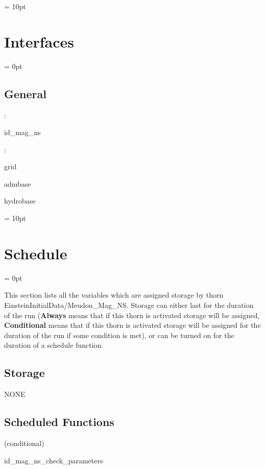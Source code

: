 \vspace{0.5cm}\parskip = 10pt 

\section{Interfaces} 


\parskip = 0pt

\vspace{3mm} \subsection*{General}

: 

id\_mag\_ns
\vspace{2mm}

: 

grid

admbase

hydrobase
\vspace{2mm}

\vspace{5mm}\parskip = 10pt 

\section{Schedule} 


\parskip = 0pt


\noindent This section lists all the variables which are assigned storage by thorn EinsteinInitialData/Meudon\_Mag\_NS.  Storage can either last for the duration of the run ({\bf Always} means that if this thorn is activated storage will be assigned, {\bf Conditional} means that if this thorn is activated storage will be assigned for the duration of the run if some condition is met), or can be turned on for the duration of a schedule function.


\subsection*{Storage}NONE
\subsection*{Scheduled Functions}
\vspace{5mm}

   (conditional) 

\hspace{5mm} id\_mag\_ns\_check\_parameters 


